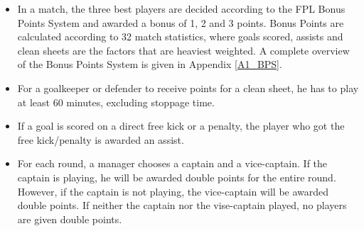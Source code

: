 \begin{itemize}
    \item In a match, the three best players are decided according to the FPL Bonus Points System and awarded a bonus of 1, 2 and 3 points. Bonus Points are calculated according to 32 match statistics, where goals scored, assists and clean sheets are the factors that are heaviest weighted. A complete overview of the Bonus Points System is given in Appendix \ref{A1_BPS}.
    \item For a goalkeeper or defender to receive points for a clean sheet, he has to play at least 60 minutes, excluding stoppage time. 
    \item If a goal is scored on a direct free kick or a penalty, the player who got the free kick/penalty is awarded an assist. 
    \item For each round, a manager chooses a captain and a vice-captain. If the captain is playing, he will be awarded double points for the entire round. However, if the captain is not playing, the vice-captain will be awarded double points. If neither the captain nor the vise-captain played, no players are given double points.
\end{itemize}


